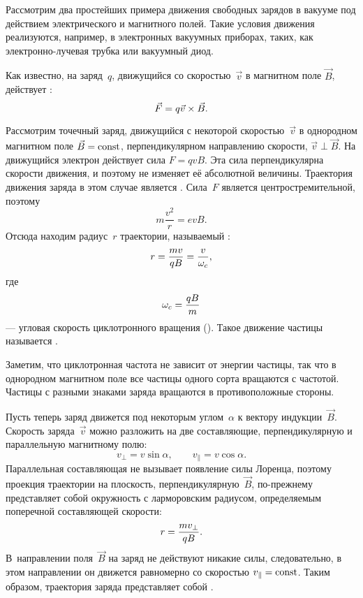 
Рассмотрим два простейших примера движения свободных зарядов в вакууме под
действием электрического и магнитного полей. Такие условия движения реализуются,
например, в электронных вакуумных приборах, таких, как электронно-лучевая
трубка или вакуумный диод.



Как известно, на заряд~$q$, движущийся со скоростью~$\vec{v}$ в магнитном поле
$\vec{B}$, действует :
\begin{equation*}
    \eqmark{3.1}
    \vec{F}=q{\vec{v}}\times{\vec{B}}.
\end{equation*}

Рассмотрим точечный заряд, движущийся с некоторой скоростью~$\vec{v}$ в
однородном магнитном поле $\vec{B}=\mathrm{const}$, перпендикулярном направлению
скорости, $\vec{v}\perp \vec{B}$. На движущийся электрон действует сила
$F=qvB$. Эта сила перпендикулярна скорости движения, и поэтому не изменяет её
абсолютной величины. Траектория движения заряда в этом случае является
. Сила~$F$ является центростремительной, поэтому
\[
m\frac{v^2}{r}=evB.
\]
Отсюда находим радиус~$r$ траектории, называемый :
\begin{equation}
    \eqmark{3.2}
    r =\frac{m v}{qB}= \frac{v}{\omega_c},
\end{equation}
где
\begin{equation}
    \eqmark{omega-B}
    \omega_c=\frac{qB}{m}
\end{equation}
--- угловая скорость циклотронного вращения ().
Такое движение частицы называется .

Заметим, что циклотронная частота не зависит от энергии частицы, так
что в однородном магнитном поле все частицы одного сорта вращаются с
 частотой. Частицы с разными знаками заряда вращаются в
противоположные стороны.

Пусть теперь заряд движется под некоторым углом~$\alpha$ к вектору
индукции~$\vec{B}$. Скорость заряда~$\vec{v}$ можно разложить
на две составляющие, перпендикулярную и параллельную магнитному полю:
\begin{equation*}
    v_{\perp}=v\sin\alpha,\qquad v_{\parallel}=v\cos\alpha.
\end{equation*}
Параллельная составляющая не вызывает появление силы Лоренца, поэтому
проекция траектории на плоскость, перпендикулярную~$\vec{B}$,
по-прежнему представляет собой окружность с ларморовским радиусом,
определяемым поперечной составляющей скорости:
\begin{equation}
    \eqmark{3.4}
    r =\frac{m v_{\perp}}{qB}.
\end{equation}
В~направлении поля~$\vec{B}$ на заряд не действуют никакие силы,
следовательно, в этом направлении он движется равномерно со скоростью
$v_{\parallel}=\mathrm{const}$. Таким образом, траектория заряда представляет собой
.

